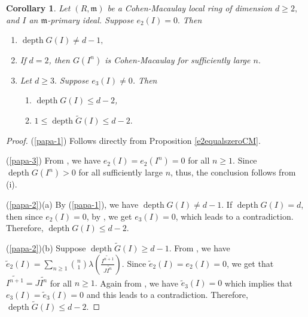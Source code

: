 \documentclass[reqno,a4paper,dvipsnames]{amsart}
\newcommand{\m}{\mathfrak{m} }
\newcommand{\depth}{\operatorname{depth}}
\newtheorem{corollary}[theorem]{Corollary}
\theoremstyle{definition}
\begin{document}
\begin{corollary} \label{core2equalszeroCM}
     Let $(R, \m)$ be a Cohen-Macaulay local ring of dimension $d \geq 2,$ and $I$ an $\m$-primary ideal. Suppose $e_{2}(I)=0.$ Then 
     \begin{enumerate}[\normalfont(i)]
        \item \label{papa-1}
        $\depth G(I) \neq d-1,$ 

        \item \label{papa-3}\cite[Theorem 1]{narita}
        If $d=2$, then  $G(I^{n})$ is Cohen-Macaulay for sufficiently large $n.$ 
        
\item \label{papa-2}
Let $d \geq 3.$ Suppose  $e_3(I) \not =0$. Then 
\begin{enumerate}[\normalfont(a)]
\item 
\label{papa-2-1}
  $\depth G(I) \leq  d-2$,

\item \label{papa-2-2}
$1 \leq \depth \widetilde{G}(I)\leq d-2.$
\end{enumerate}
\end{enumerate}
\end{corollary}
\begin{proof}
 (\ref{papa-1}) Follows directly from Proposition \ref{e2equalszeroCM}. 
    
 (\ref{papa-3}) From \cite[Lemma 2.12]{tjm}, we have $e_{2}(I)=e_{2}(I^{n})=0$ for all $n \geq 1.$ Since  $\depth G(I^{n}) >0$ for all sufficiently large $n$,  thus, the conclusion follows from (i).


 (\ref{papa-2})(a) By  (\ref{papa-1}),  we have
 $\depth G(I) \neq d-1.$  If   $\depth G(I) = d$, then since $e_2(I)=0$,  by \cite[Corollary~2 (2)]{marley},   we get  $e_3(I)=0$, which leads to a contradiction. Therefore, $\depth G(I) \leq d-2.$
 
  (\ref{papa-2})(b) Suppose  $\depth \widetilde{G}(I)\geq d-1.$ From \cite[Theorem 2.5]{rv}, 
    we have 
    $\widetilde{e}_{2}(I)=\displaystyle \sum_{n\geq1}\binom{n}{1}\lambda\left(\frac{\widetilde{I^{n+1}}}{J\widetilde{I^{n}}}\right).$ Since $\widetilde{e}_{2}(I) = e_2(I) =0$, we get   that 
    $\widetilde{I^{n+1}}= J\widetilde{I^{n}}$ for all $n \geq 1.$ Again from \cite[Theorem 2.5]{rv},
    we have $\widetilde{e}_{3}(I)=0$ which   implies that   $e_{3}(I)=\widetilde{e}_{3}(I)=0$ and this leads to a  contradiction. Therefore,  $\depth \widetilde{G}(I)\leq d-2.$ \qedhere
\end{proof}
\end{document}
